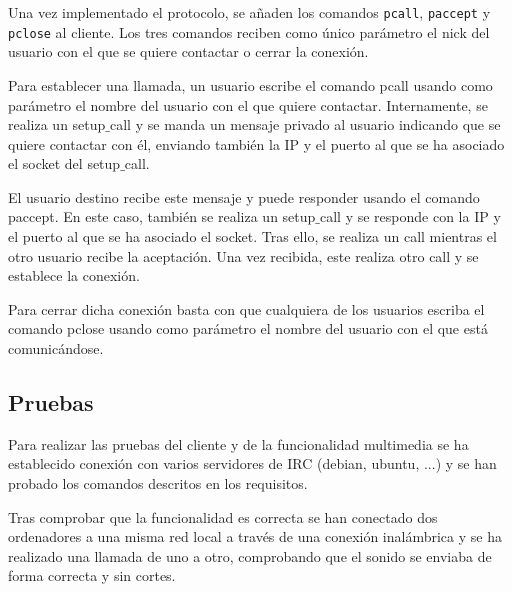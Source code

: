 \documentclass{mathnotes}
\begin{document}
Una vez implementado el protocolo, se añaden los comandos \texttt{pcall}, \texttt{paccept} y \texttt{pclose} al cliente. Los tres comandos reciben como único parámetro el nick del usuario con el que se quiere contactar o cerrar la conexión.

Para establecer una llamada, un usuario escribe el comando pcall usando como parámetro el nombre del usuario con el que quiere contactar. Internamente, se realiza un setup$\_$call y se manda un mensaje privado al usuario indicando que se quiere contactar con él, enviando también la IP y el puerto al que se ha asociado el socket del setup$\_$call. 

El usuario destino recibe este mensaje y puede responder usando el comando paccept. En este caso, también se realiza un setup$\_$call y se responde con la IP y el puerto al que se ha asociado el socket. Tras ello, se realiza un call mientras el otro usuario recibe la aceptación. Una vez recibida, este realiza otro call y se establece la conexión.

Para cerrar dicha conexión basta con que cualquiera de los usuarios escriba el comando pclose usando como parámetro el nombre del usuario con el que está comunicándose.

\subsection{Pruebas}
Para realizar las pruebas del cliente y de la funcionalidad multimedia se ha establecido conexión con varios servidores de IRC (debian, ubuntu, ...) y se han probado los comandos descritos en los requisitos. 

Tras comprobar que la funcionalidad es correcta se han conectado dos ordenadores a una misma red local a través de una conexión inalámbrica y se ha realizado una llamada de uno a otro, comprobando que el sonido se enviaba de forma correcta y sin cortes.
\end{document}
